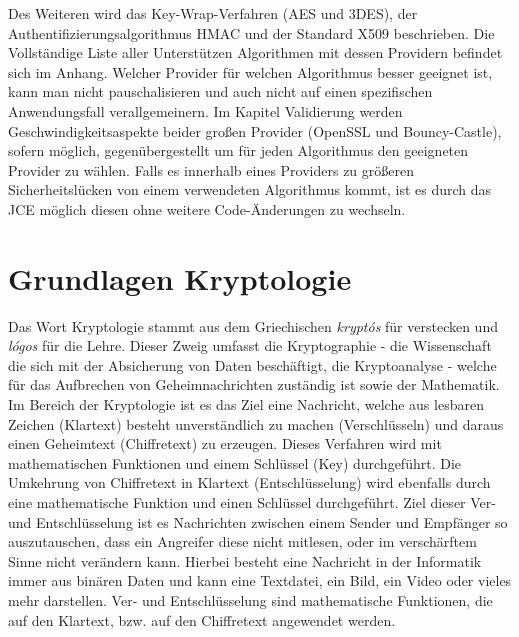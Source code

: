 \documentclass[10pt, a4paper,headsepline]{scrreprt}
\begin{document}
Des Weiteren wird das Key-Wrap-Verfahren (AES und 3DES), der Authentifizierungsalgorithmus HMAC und der Standard X509 beschrieben. Die Vollständige Liste aller Unterstützen Algorithmen mit dessen Providern befindet sich im Anhang. Welcher Provider für welchen Algorithmus besser geeignet ist, kann man nicht pauschalisieren und auch nicht auf einen spezifischen Anwendungsfall verallgemeinern. Im Kapitel Validierung werden Geschwindigkeitsaspekte beider großen Provider (OpenSSL und Bouncy-Castle), sofern möglich, gegenübergestellt um für jeden Algorithmus den geeigneten Provider zu wählen. Falls es innerhalb eines Providers zu größeren Sicherheitslücken von einem verwendeten Algorithmus kommt, ist es durch das JCE möglich diesen ohne weitere Code-Änderungen zu wechseln. 


\chapter{Grundlagen Kryptologie}
Das Wort Kryptologie stammt aus dem Griechischen \textit{kryptós} für verstecken und \textit{lógos} für die Lehre.%
Dieser Zweig umfasst die Kryptographie - die Wissenschaft die sich mit der Absicherung von Daten beschäftigt, die Kryptoanalyse - welche für das Aufbrechen von Geheimnachrichten zuständig ist sowie der Mathematik.
Im Bereich der Kryptologie ist es das Ziel eine Nachricht, welche aus lesbaren Zeichen (Klartext) besteht unverständlich zu machen (Verschlüsseln) und daraus einen Geheimtext (Chiffretext) zu erzeugen. Dieses Verfahren wird mit mathematischen Funktionen und einem Schlüssel (Key) durchgeführt. Die Umkehrung von Chiffretext in Klartext (Entschlüsselung) wird ebenfalls durch eine mathematische Funktion und einen Schlüssel durchgeführt. Ziel dieser Ver- und Entschlüsselung ist es Nachrichten zwischen einem Sender und Empfänger so auszutauschen, dass ein Angreifer diese nicht mitlesen, oder im verschärftem Sinne nicht verändern kann. Hierbei besteht eine Nachricht in der Informatik immer aus binären Daten und kann eine Textdatei, ein Bild, ein Video oder vieles mehr darstellen. Ver- und Entschlüsselung sind mathematische Funktionen, die auf den Klartext, bzw. auf den Chiffretext angewendet werden. 
\end{document}
